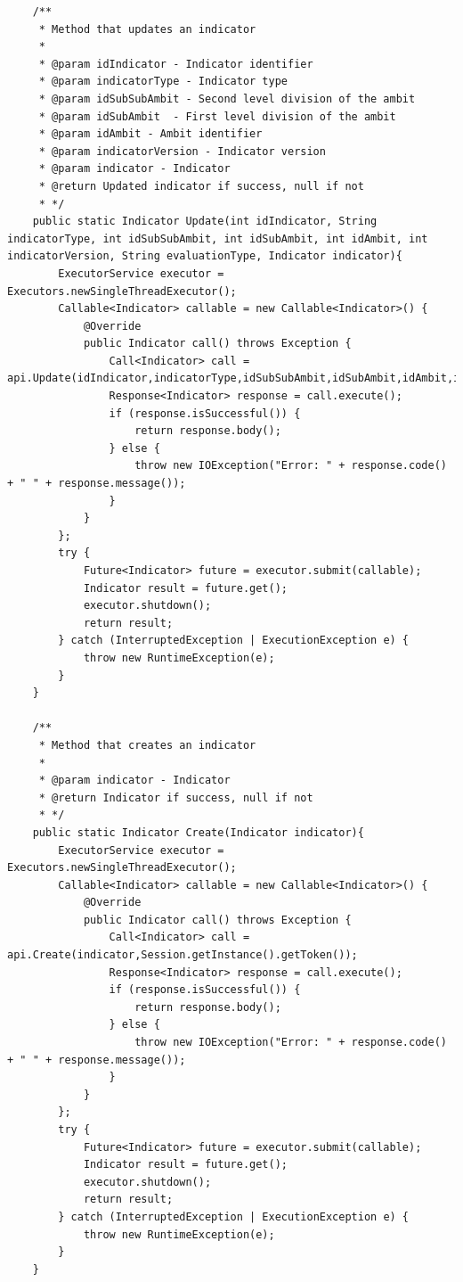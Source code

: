 \begin{itemize}
\begin{itemize}
\begin{lstlisting}
    /**
     * Method that updates an indicator
     *
     * @param idIndicator - Indicator identifier
     * @param indicatorType - Indicator type
     * @param idSubSubAmbit - Second level division of the ambit
     * @param idSubAmbit  - First level division of the ambit
     * @param idAmbit - Ambit identifier
     * @param indicatorVersion - Indicator version
     * @param indicator - Indicator
     * @return Updated indicator if success, null if not
     * */
    public static Indicator Update(int idIndicator, String indicatorType, int idSubSubAmbit, int idSubAmbit, int idAmbit, int indicatorVersion, String evaluationType, Indicator indicator){
        ExecutorService executor = Executors.newSingleThreadExecutor();
        Callable<Indicator> callable = new Callable<Indicator>() {
            @Override
            public Indicator call() throws Exception {
                Call<Indicator> call = api.Update(idIndicator,indicatorType,idSubSubAmbit,idSubAmbit,idAmbit,indicatorVersion,evaluationType,indicator,Session.getInstance().getToken());
                Response<Indicator> response = call.execute();
                if (response.isSuccessful()) {
                    return response.body();
                } else {
                    throw new IOException("Error: " + response.code() + " " + response.message());
                }
            }
        };
        try {
            Future<Indicator> future = executor.submit(callable);
            Indicator result = future.get();
            executor.shutdown();
            return result;
        } catch (InterruptedException | ExecutionException e) {
            throw new RuntimeException(e);
        }
    }

    /**
     * Method that creates an indicator
     *
     * @param indicator - Indicator
     * @return Indicator if success, null if not
     * */
    public static Indicator Create(Indicator indicator){
        ExecutorService executor = Executors.newSingleThreadExecutor();
        Callable<Indicator> callable = new Callable<Indicator>() {
            @Override
            public Indicator call() throws Exception {
                Call<Indicator> call = api.Create(indicator,Session.getInstance().getToken());
                Response<Indicator> response = call.execute();
                if (response.isSuccessful()) {
                    return response.body();
                } else {
                    throw new IOException("Error: " + response.code() + " " + response.message());
                }
            }
        };
        try {
            Future<Indicator> future = executor.submit(callable);
            Indicator result = future.get();
            executor.shutdown();
            return result;
        } catch (InterruptedException | ExecutionException e) {
            throw new RuntimeException(e);
        }
    }


\end{lstlisting}
\end{itemize}
\end{itemize}
